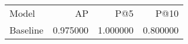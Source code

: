 \begin{tabular}{lrrr}
Model & AP & P@5 & P@10 \\
Baseline & 0.975000 & 1.000000 & 0.800000 \\
\end{tabular}
